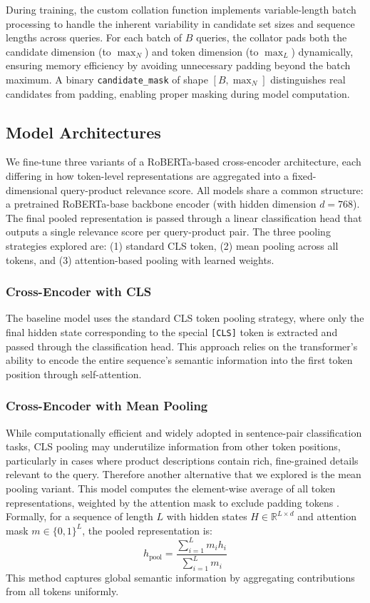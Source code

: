 \documentclass[10pt]{article}
\begin{document}
During training, the custom collation function implements variable-length batch processing to handle the inherent variability in candidate set sizes and sequence lengths across queries. For each batch of $B$ queries, the collator pads both the candidate dimension (to $\max_N$) and token dimension (to $\max_L$) dynamically, ensuring memory efficiency by avoiding unnecessary padding beyond the batch maximum. A binary \texttt{candidate\_mask} of shape $[B, \max_N]$ distinguishes real candidates from padding, enabling proper masking during model computation. 
\subsection*{Model Architectures}
We fine-tune three variants of a RoBERTa-based cross-encoder architecture, each differing in how token-level representations are aggregated into a fixed-dimensional query-product relevance score. All models share a common structure: a pretrained RoBERTa-base backbone encoder (with hidden dimension $d=768$). The final pooled representation is passed through a linear classification head that outputs a single relevance score per query-product pair. The three pooling strategies explored are: (1) standard CLS token, (2) mean pooling across all tokens, and (3) attention-based pooling with learned weights.

\subsubsection*{Cross-Encoder with CLS }
The baseline model uses the standard CLS token pooling strategy, where only the final hidden state corresponding to the special \texttt{[CLS]} token is extracted and passed through the classification head. This approach relies on the transformer's ability to encode the entire sequence's semantic information into the first token position through self-attention. 

\subsubsection*{Cross-Encoder with Mean Pooling}
While computationally efficient and widely adopted in sentence-pair classification tasks, CLS pooling may underutilize information from other token positions, particularly in cases where product descriptions contain rich, fine-grained details relevant to the query. Therefore another alternative that we explored is the mean pooling variant. This model computes the element-wise average of all token representations, weighted by the attention mask to exclude padding tokens \cite{xing2025comparativeanalysispoolingmechanisms}. Formally, for a sequence of length $L$ with hidden states $H \in \mathbb{R}^{L \times d}$ and attention mask $m \in \{0,1\}^L$, the pooled representation is:
\[
h_{\text{pool}} = \frac{\sum_{i=1}^{L} m_i h_i}{\sum_{i=1}^{L} m_i}
\]
This method captures global semantic information by aggregating contributions from all tokens uniformly.
\end{document}
